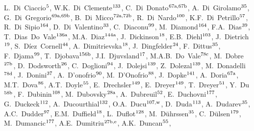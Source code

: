 \begin{flushleft}
L.~Di~Ciaccio$^\textrm{\scriptsize 5}$,    
W.K.~Di~Clemente$^\textrm{\scriptsize 133}$,    
C.~Di~Donato$^\textrm{\scriptsize 67a,67b}$,    
A.~Di~Girolamo$^\textrm{\scriptsize 35}$,    
G.~Di~Gregorio$^\textrm{\scriptsize 69a,69b}$,    
B.~Di~Micco$^\textrm{\scriptsize 72a,72b}$,    
R.~Di~Nardo$^\textrm{\scriptsize 100}$,    
K.F.~Di~Petrillo$^\textrm{\scriptsize 57}$,    
R.~Di~Sipio$^\textrm{\scriptsize 164}$,    
D.~Di~Valentino$^\textrm{\scriptsize 33}$,    
C.~Diaconu$^\textrm{\scriptsize 99}$,    
M.~Diamond$^\textrm{\scriptsize 164}$,    
F.A.~Dias$^\textrm{\scriptsize 39}$,    
T.~Dias~Do~Vale$^\textrm{\scriptsize 136a}$,    
M.A.~Diaz$^\textrm{\scriptsize 144a}$,    
J.~Dickinson$^\textrm{\scriptsize 18}$,    
E.B.~Diehl$^\textrm{\scriptsize 103}$,    
J.~Dietrich$^\textrm{\scriptsize 19}$,    
S.~D\'iez~Cornell$^\textrm{\scriptsize 44}$,    
A.~Dimitrievska$^\textrm{\scriptsize 18}$,    
J.~Dingfelder$^\textrm{\scriptsize 24}$,    
F.~Dittus$^\textrm{\scriptsize 35}$,    
F.~Djama$^\textrm{\scriptsize 99}$,    
T.~Djobava$^\textrm{\scriptsize 156b}$,    
J.I.~Djuvsland$^\textrm{\scriptsize 17}$,    
M.A.B.~Do~Vale$^\textrm{\scriptsize 78c}$,    
M.~Dobre$^\textrm{\scriptsize 27b}$,    
D.~Dodsworth$^\textrm{\scriptsize 26}$,    
C.~Doglioni$^\textrm{\scriptsize 94}$,    
J.~Dolejsi$^\textrm{\scriptsize 139}$,    
Z.~Dolezal$^\textrm{\scriptsize 139}$,    
M.~Donadelli$^\textrm{\scriptsize 78d}$,    
J.~Donini$^\textrm{\scriptsize 37}$,    
A.~D'onofrio$^\textrm{\scriptsize 90}$,    
M.~D'Onofrio$^\textrm{\scriptsize 88}$,    
J.~Dopke$^\textrm{\scriptsize 141}$,    
A.~Doria$^\textrm{\scriptsize 67a}$,    
M.T.~Dova$^\textrm{\scriptsize 86}$,    
A.T.~Doyle$^\textrm{\scriptsize 55}$,    
E.~Drechsler$^\textrm{\scriptsize 149}$,    
E.~Dreyer$^\textrm{\scriptsize 149}$,    
T.~Dreyer$^\textrm{\scriptsize 51}$,    
Y.~Du$^\textrm{\scriptsize 58b}$,    
F.~Dubinin$^\textrm{\scriptsize 108}$,    
M.~Dubovsky$^\textrm{\scriptsize 28a}$,    
A.~Dubreuil$^\textrm{\scriptsize 52}$,    
E.~Duchovni$^\textrm{\scriptsize 177}$,    
G.~Duckeck$^\textrm{\scriptsize 112}$,    
A.~Ducourthial$^\textrm{\scriptsize 132}$,    
O.A.~Ducu$^\textrm{\scriptsize 107,w}$,    
D.~Duda$^\textrm{\scriptsize 113}$,    
A.~Dudarev$^\textrm{\scriptsize 35}$,    
A.C.~Dudder$^\textrm{\scriptsize 97}$,    
E.M.~Duffield$^\textrm{\scriptsize 18}$,    
L.~Duflot$^\textrm{\scriptsize 128}$,    
M.~D\"uhrssen$^\textrm{\scriptsize 35}$,    
C.~D{\"u}lsen$^\textrm{\scriptsize 179}$,    
M.~Dumancic$^\textrm{\scriptsize 177}$,    
A.E.~Dumitriu$^\textrm{\scriptsize 27b,e}$,    
A.K.~Duncan$^\textrm{\scriptsize 55}$,    

\end{flushleft}
